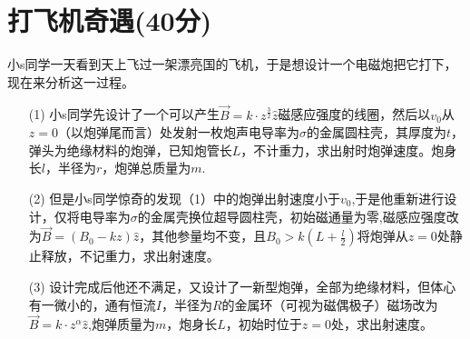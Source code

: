 \documentclass{article}
\begin{document}
\section*{打飞机奇遇(40分)}
小s同学一天看到天上飞过一架漂亮国的飞机，于是想设计一个电磁炮把它打下，现在来分析这一过程。
\begin{itemize}
\item[(1)]小s同学先设计了一个可以产生$\vec{B}=k\cdot z^{\frac{3}{2}}\hat{z}$磁感应强度的线圈，然后以$v_0$从$z=0$（以炮弹尾而言）处发射一枚炮声电导率为$\sigma$的金属圆柱壳，其厚度为$t$，弹头为绝缘材料的炮弹，已知炮管长$L$，不计重力，求出射时炮弹速度。炮身长$l$，半径为$r$，炮弹总质量为$m$.
\item[(2)]但是小s同学惊奇的发现（1）中的炮弹出射速度小于$v_0$,于是他重新进行设计，仅将电导率为$\sigma$的金属壳换位超导圆柱壳，初始磁通量为零,磁感应强度改为$\vec{B}=(B_0-kz)\hat{z}$，其他参量均不变，且$B_0>k(L+\frac{l}{2})$将炮弹从$z=0$处静止释放，不记重力，求出射速度。
\item[(3)]设计完成后他还不满足，又设计了一新型炮弹，全部为绝缘材料，但体心有一微小的，通有恒流$I$，半径为$R$的金属环（可视为磁偶极子）磁场改为$\vec{B}=k\cdot z^{\alpha}\hat{z}$,炮弹质量为$m$，炮身长$L$，初始时位于$z=0$处，求出射速度。
\end{itemize}
\end{document}
